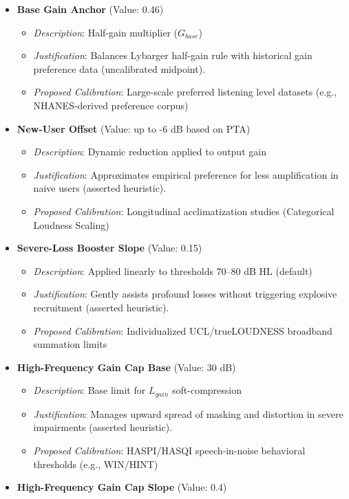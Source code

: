 \documentclass[
  12pt,
]{article}
\providecommand{\tightlist}{%
  \setlength{\itemsep}{0pt}\setlength{\parskip}{0pt}}
\begin{document}
\begin{itemize}
\tightlist
\item
  \textbf{Base Gain Anchor} (Value: 0.46)

  \begin{itemize}
  \tightlist
  \item
    \emph{Description}: Half-gain multiplier (\(G_{base}\))
  \item
    \emph{Justification}: Balances Lybarger half-gain rule with
    historical gain preference data (uncalibrated midpoint).
  \item
    \emph{Proposed Calibration}: Large-scale preferred listening level
    datasets (e.g., NHANES-derived preference corpus)
  \end{itemize}
\item
  \textbf{New-User Offset} (Value: up to -6 dB based on PTA)

  \begin{itemize}
  \tightlist
  \item
    \emph{Description}: Dynamic reduction applied to output gain
  \item
    \emph{Justification}: Approximates empirical preference for less
    amplification in naive users (asserted heuristic).
  \item
    \emph{Proposed Calibration}: Longitudinal acclimatization studies
    (Categorical Loudness Scaling)
  \end{itemize}
\item
  \textbf{Severe-Loss Booster Slope} (Value: 0.15)

  \begin{itemize}
  \tightlist
  \item
    \emph{Description}: Applied linearly to thresholds 70--80 dB HL
    (default)
  \item
    \emph{Justification}: Gently assists profound losses without
    triggering explosive recruitment (asserted heuristic).
  \item
    \emph{Proposed Calibration}: Individualized UCL/trueLOUDNESS
    broadband summation limits
  \end{itemize}
\item
  \textbf{High-Frequency Gain Cap Base} (Value: 30 dB)

  \begin{itemize}
  \tightlist
  \item
    \emph{Description}: Base limit for \(L_{gain}\) soft-compression
  \item
    \emph{Justification}: Manages upward spread of masking and
    distortion in severe impairments (asserted heuristic).
  \item
    \emph{Proposed Calibration}: HASPI/HASQI speech-in-noise behavioral
    thresholds (e.g., WIN/HINT)
  \end{itemize}
\item
  \textbf{High-Frequency Gain Cap Slope} (Value: 0.4)


\end{itemize}
\end{document}
